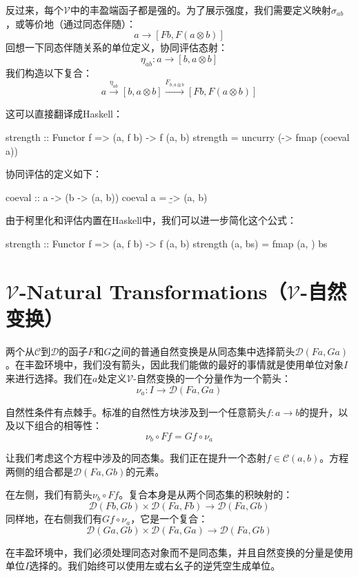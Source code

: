 \documentclass[DaoFP]{subfiles}
\begin{document}
 反过来，每个$\mathcal V$中的丰盈端函子都是强的。为了展示强度，我们需要定义映射$\sigma_{a b}$，或等价地（通过同态伴随）：
 \[ a \to [F b, F (a \otimes b)] \]
 回想一下同态伴随关系的单位定义，协同评估态射：
 \[ \eta_{a b} \colon a \to [b, a \otimes b] \]
 我们构造以下复合：
 \[ a \xrightarrow{\eta_{a b}} [b, a \otimes b] \xrightarrow{F_{b, a \otimes b}} [F b, F (a \otimes b)] \]

 这可以直接翻译成Haskell：
 \begin{haskell}
  strength :: Functor f => (a, f b) -> f (a, b)
  strength = uncurry (\a -> fmap (coeval a))
 \end{haskell}
 协同评估的定义如下：
 \begin{haskell}
  coeval :: a -> (b -> (a, b))
  coeval a = \b -> (a, b)
 \end{haskell}
 由于柯里化和评估内置在Haskell中，我们可以进一步简化这个公式：
 \begin{haskell}
  strength :: Functor f => (a, f b) -> f (a, b)
  strength (a, bs) = fmap (a, ) bs
 \end{haskell}

 \section{$\mathcal V$-Natural Transformations（$\mathcal V$-自然变换）}

 两个从$\mathcal C$到$\mathcal D$的函子$F$和$G$之间的普通自然变换是从同态集中选择箭头$\mathcal D(F a, G a)$。在丰盈环境中，我们没有箭头，因此我们能做的最好的事情就是使用单位对象$I$来进行选择。我们在$a$处定义$\mathcal V$-自然变换的一个分量作为一个箭头：
 \[ \nu_a \colon I \to \mathcal D(F a, G a) \]

 自然性条件有点棘手。标准的自然性方块涉及到一个任意箭头$f \colon a \to b$的提升，以及以下组合的相等性：
 \[ \nu_b \circ F f = G f \circ \nu_a \]

 让我们考虑这个方程中涉及的同态集。我们正在提升一个态射$f \in \mathcal C(a, b)$。方程两侧的组合都是$\mathcal D(F a, G b)$的元素。

 在左侧，我们有箭头$\nu_b \circ F f$。复合本身是从两个同态集的积映射的：
 \[  \mathcal D(F b, G b) \times \mathcal D(F a, F b) \to \mathcal D(F a, G b) \]
 同样地，在右侧我们有$G f \circ \nu_a$，它是一个复合：
 \[ \mathcal D(G a, G b) \times \mathcal D(F a, G a) \to  \mathcal D(F a, G b) \]

 在丰盈环境中，我们必须处理同态对象而不是同态集，并且自然变换的分量是使用单位$I$选择的。我们始终可以使用左或右幺子的逆凭空生成单位。
\end{document}
